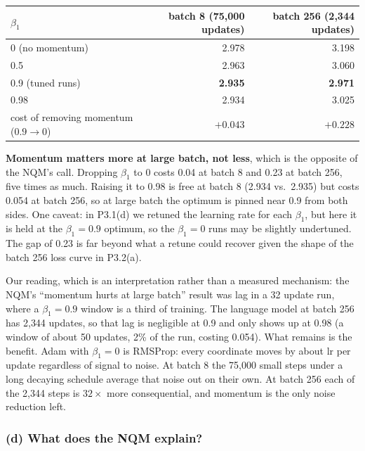 \documentclass[10pt,letterpaper]{article}
\begin{document}
\begin{table}[H]\centering\small
\begin{tabular}{lrr}\toprule
$\beta_1$ & batch 8 (75{,}000 updates) & batch 256 (2{,}344 updates)\\\midrule
0 (no momentum) & 2.978 & 3.198\\
0.5 & 2.963 & 3.060\\
0.9 (tuned runs) & \textbf{2.935} & \textbf{2.971}\\
0.98 & 2.934 & 3.025\\\midrule
cost of removing momentum ($0.9\to0$) & $+0.043$ & $+0.228$\\\bottomrule
\end{tabular}
\end{table}

\textbf{Momentum matters more at large batch, not less}, which is the opposite of the NQM's call. Dropping $\beta_1$ to 0 costs 0.04 at batch 8 and 0.23 at batch 256, five times as much. Raising it to 0.98 is free at batch 8 (2.934 vs.\ 2.935) but costs 0.054 at batch 256, so at large batch the optimum is pinned near 0.9 from both sides. One caveat: in P3.1(d) we retuned the learning rate for each $\beta_1$, but here it is held at the $\beta_1=0.9$ optimum, so the $\beta_1=0$ runs may be slightly undertuned. The gap of 0.23 is far beyond what a retune could recover given the shape of the batch 256 loss curve in P3.2(a).

Our reading, which is an interpretation rather than a measured mechanism: the NQM's ``momentum hurts at large batch'' result was lag in a 32 update run, where a $\beta_1=0.9$ window is a third of training. The language model at batch 256 has 2{,}344 updates, so that lag is negligible at 0.9 and only shows up at 0.98 (a window of about 50 updates, 2\% of the run, costing 0.054). What remains is the benefit. Adam with $\beta_1=0$ is RMSProp: every coordinate moves by about $\mathrm{lr}$ per update regardless of signal to noise. At batch 8 the 75{,}000 small steps under a long decaying schedule average that noise out on their own. At batch 256 each of the 2{,}344 steps is $32\times$ more consequential, and momentum is the only noise reduction left.

\subsubsection*{(d) What does the NQM explain?}
\end{document}
